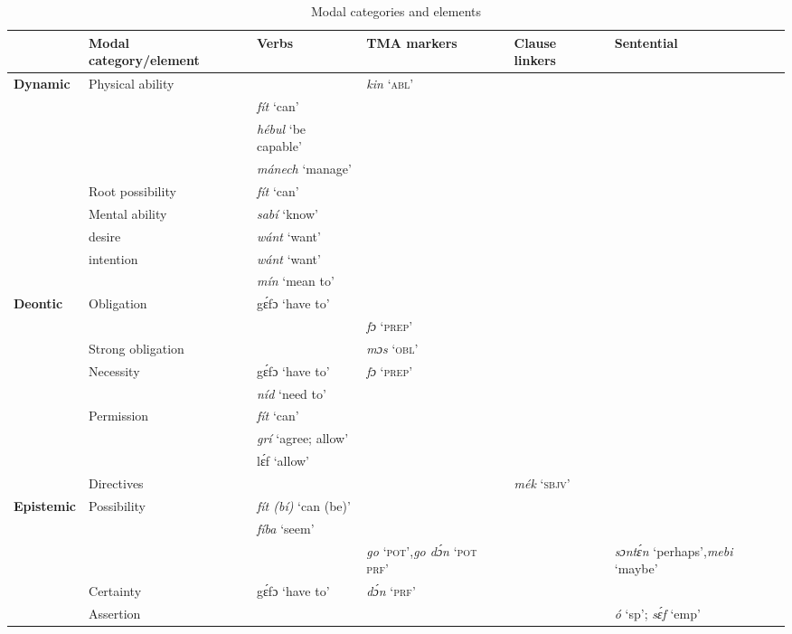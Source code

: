 \begin{sidewaystable}
\caption{Modal categories and elements}
\label{tab:key:6.8}
\footnotesize
\begin{tabularx}{\textwidth}{llQQQQ}
\lsptoprule
&Modal category/element & Verbs  & TMA markers & Clause linkers & Sentential \\
\midrule 
\textbf{Dynamic} & Physical ability &  & \textit{kin} {‘}{\textsc{abl’}} &  & \\
&& \textit{fít} {‘can’} &  &  & \\
&& \textit{hébul} {‘be capable’} &  &  & \\
&& \textit{mánech} {‘manage’} &  &  & \\
&Root possibility & \textit{fít} {‘can’} &  &  & \\
&Mental ability & \textit{sabí}{ ‘know’} &  &  & \\
&desire & \textit{wánt} {‘want’} &  &  & \\
&intention & \textit{wánt} {‘want’} &  &  & \\
&& \textit{mín} {‘mean to’} &  &  & \\

\midrule
\textbf{Deontic} &   Obligation & gɛ́fɔ ‘have to’ &  &  & \\
&&  & \textit{fɔ} {‘}{\textsc{prep}}{’} &  & \\
&Strong obligation &  & \textit{mɔs} {‘}{\textsc{obl}}{’} &  & \\
&Necessity & gɛ́fɔ ‘have to’ & \textit{fɔ} {‘}{\textsc{prep}}{’} &  & \\
&& \textit{níd} {‘need to’} &  &  & \\
&Permission & \textit{fít} {‘can’} &  &  & \\
&& \textit{grí} {‘agree; allow}’ &  &  & \\
&& lɛ́f ‘allow’ &  &  & \\
&Directives &  &  & \textit{mék} {‘}{\textsc{sbjv}}{’} & \\

\midrule
\textbf{Epistemic} & Possibility & \textit{fít (bí)} {‘can} {(be)’} &  &  & \\
&& \textit{fíba} {‘seem’} &  &  & \\
&&  & \textit{go} {‘}{\textsc{pot}}{’,}\newline  \textit{go dɔ́n}\textit{} {‘}{\textsc{pot}}{} {\textsc{prf}}{’} &  & \textit{sɔntɛ́n} ‘perhaps’,\newline  \textit{mebi} ‘maybe’\\
&Certainty & gɛ́fɔ ‘have to’ & \textit{dɔ́n} {‘}{\textsc{prf}}{’} &  & \\
&Assertion &  &  &  & \textit{ó} ‘sp’; \textit{sɛ́f} ‘emp’ \\


\end{tabularx}
\end{sidewaystable}

